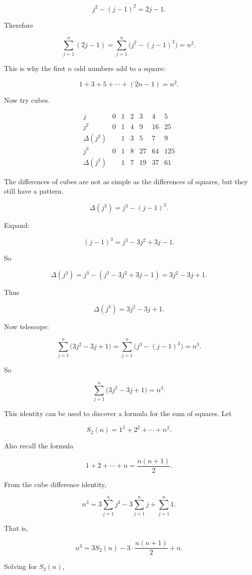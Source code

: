 \[
j^2-(j-1)^2=2j-1.
\]

Therefore

\[
\sum_{j=1}^{n}(2j-1)
=
\sum_{j=1}^{n}\bigl(j^2-(j-1)^2\bigr)
=
n^2.
\]

This is why the first \(n\) odd numbers add to a square:

\[
\boxed{1+3+5+\cdots+(2n-1)=n^2.}
\]

Now try cubes.

\[
\begin{array}{c|rrrrrr}
j & 0 & 1 & 2 & 3 & 4 & 5 \\ \hline
j^2 & 0 & 1 & 4 & 9 & 16 & 25 \\
\Delta(j^2) & & 1 & 3 & 5 & 7 & 9 \\[2mm]
j^3 & 0 & 1 & 8 & 27 & 64 & 125 \\
\Delta(j^3) & & 1 & 7 & 19 & 37 & 61
\end{array}
\]

The differences of cubes are not as simple as the differences of squares, but they still have a pattern.

\[
\Delta(j^3)=j^3-(j-1)^3.
\]

Expand:

\[
(j-1)^3=j^3-3j^2+3j-1.
\]

So

\[
\Delta(j^3)
=
j^3-(j^3-3j^2+3j-1)
=
3j^2-3j+1.
\]

Thus

\[
\boxed{\Delta(j^3)=3j^2-3j+1.}
\]

Now telescope:

\[
\sum_{j=1}^{n}\bigl(3j^2-3j+1\bigr)
=
\sum_{j=1}^{n}\bigl(j^3-(j-1)^3\bigr)
=
n^3.
\]

So

\[
\boxed{\sum_{j=1}^{n}\bigl(3j^2-3j+1\bigr)=n^3.}
\]

This identity can be used to discover a formula for the sum of squares. Let

\[
S_2(n)=1^2+2^2+\cdots+n^2.
\]

Also recall the formula

\[
1+2+\cdots+n=\frac{n(n+1)}{2}.
\]

From the cube difference identity,

\[
n^3
=
3\sum_{j=1}^{n}j^2
-
3\sum_{j=1}^{n}j
+
\sum_{j=1}^{n}1.
\]

That is,

\[
n^3
=
3S_2(n)
-
3\cdot \frac{n(n+1)}{2}
+
n.
\]

Solving for \(S_2(n)\),

